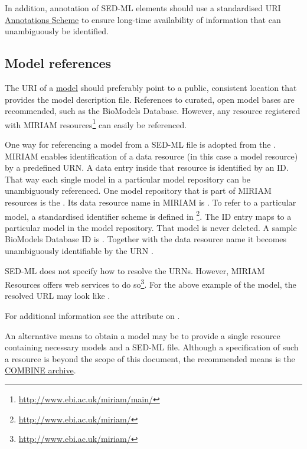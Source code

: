 In addition, annotation of SED-ML elements should use a standardised URI \hyperref[sec:annotations]{Annotations Scheme} to ensure long-time availability of information that can unambiguously be identified.


\subsection{Model references}
\label{sec:modelURI}
The URI of a \hyperref[class:model]{model} should preferably point to a public, consistent location that provides the model description file. References to curated, open model bases are recommended, such as the BioModels Database. However, any resource registered with MIRIAM resources\footnote{\url{http://www.ebi.ac.uk/miriam/main/}} can easily be referenced.

One way for referencing a model from a SED-ML file is adopted from the . MIRIAM enables identification of a data resource (in this case a model resource) by a predefined URN. A data entry inside that resource is identified by an ID. That way each single  model in a particular model repository can be unambiguously referenced. One model repository that is part of MIRIAM resources is the  \citep{LDR+10}. Its data resource name in MIRIAM is . To refer to a particular model, a standardised identifier scheme is defined in \footnote{\url{http://www.ebi.ac.uk/miriam/}}. The ID entry maps to a particular model in the model repository. That model is never deleted. A sample BioModels Database ID is . Together with the data resource name it becomes unambiguously identifiable by the URN . 

SED-ML does not specify how to resolve the URNs. However, MIRIAM Resources offers web services to do so\footnote{\url{http://www.ebi.ac.uk/miriam/}}. For the above example of the  model, the resolved URL may look like .

For additional information see the \hyperref[sec:model_source]{} attribute on \Model.

An alternative means to obtain a model may be to provide a single resource containing necessary models and a SED-ML file. Although a specification of such a resource is beyond the scope of this document, the recommended means is the \hyperref[sec:archive]{COMBINE archive}.


